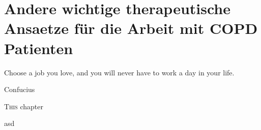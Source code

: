 \chapter{Andere wichtige therapeutische Ansaetze für die Arbeit mit COPD Patienten}
\label{chapter:andere_wichtige_therapeutische_ansaetze_für_die_arbeit_mit_copd_patienten}
\epigraph{Choose a job you love, and you will never have to work a day in your life.}{Confucius}

\ifpdf
    \graphicspath{{4_segmentation/figures/PNG/}{4_andere_wichtige_therapeutische_ansaetze_für_die_arbeit_mit_copd_patienten/figures/PDF/}{4_andere_wichtige_therapeutische_ansaetze_für_die_arbeit_mit_copd_patienten/figures/}}
\else
    \graphicspath{{4_andere_wichtige_therapeutische_ansaetze_für_die_arbeit_mit_copd_patienten/figures/EPS/}{4_andere_wichtige_therapeutische_ansaetze_für_die_arbeit_mit_copd_patienten/figures/}}
\fi

\lettrine{T}{his} chapter 


asd